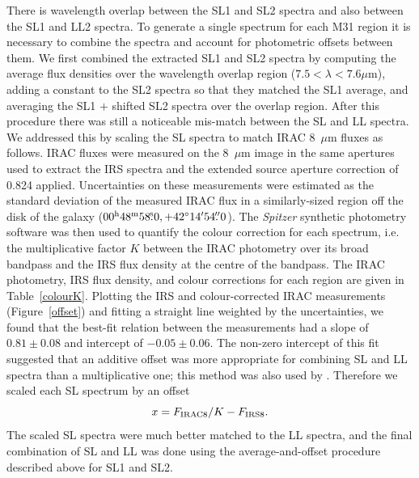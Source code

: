 There is wavelength overlap between the SL1 and SL2 spectra and also between the SL1 and LL2 spectra.
To generate a single spectrum for each M31 region it is necessary to combine the spectra and
account for photometric offsets between them. We first combined the extracted SL1 and SL2 
spectra by computing the average flux densities over the wavelength overlap region ($7.5 < \lambda< 7.6\mu$m),
adding a constant  to the SL2 spectra so that they matched the SL1 average,
and averaging the SL1 $+$ shifted SL2 spectra over the overlap region.
After this procedure there was still a noticeable mis-match between the SL and LL spectra. We addressed this
by scaling the SL spectra to match IRAC 8~$\mu$m fluxes as follows. IRAC fluxes were measured
on the 8~$\mu$m image \citep{Barmby2006lr} in the same apertures used to extract the IRS spectra
and the extended source  aperture correction of 0.824 applied.
Uncertainties on these measurements were estimated as the standard deviation of the measured
IRAC flux in a similarly-sized region off the disk of the galaxy ($00^{\rmn{h}}48^{\rmn{m}}58\fs0, +42\degr14\arcmin54\farcs0$). 
The {\em Spitzer} synthetic photometry software \citep{SpitzerDAC} 
was then used to quantify the colour correction for each spectrum, i.e. the
multiplicative factor $K$ between the IRAC photometry over its broad bandpass and the IRS flux
density at the centre of the bandpass. The IRAC photometry, IRS flux density, and colour corrections 
for each region are given in Table~\ref{colourK}. Plotting the IRS  and colour-corrected IRAC measurements
(Figure~\ref{offset}) and fitting a straight line weighted by the uncertainties, we found that the best-fit relation 
between the measurements had a slope of $0.81\pm0.08$  and intercept of $-0.05\pm0.06$. 
The non-zero intercept of this fit suggested that an additive offset was more appropriate for combining SL and LL
spectra than a multiplicative one; this method was also used by \citet{Sandstrom12}.
Therefore we scaled each SL spectrum by an offset 
\begin{equation}
x = F_{\rm IRAC8}/K -   F_{\rm IRS8}. %
\label{eq:offset}
\end{equation}
The scaled SL spectra were much better matched to the LL spectra, and the final combination
of SL and LL was done using the average-and-offset procedure described above for SL1 and SL2.

